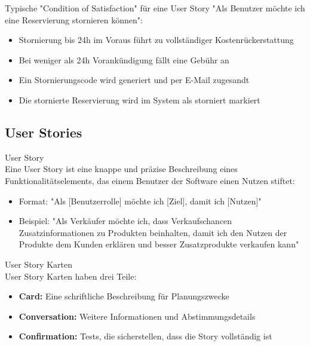\begin{example}
    Typische "Condition of Satisfaction" für eine User Story "Als Benutzer möchte ich eine Reservierung stornieren können":
    \begin{itemize}
        \item Stornierung bis 24h im Voraus führt zu vollständiger Kostenrückerstattung
        \item Bei weniger als 24h Vorankündigung fällt eine Gebühr an
        \item Ein Stornierungscode wird generiert und per E-Mail zugesandt
        \item Die stornierte Reservierung wird im System als storniert markiert
    \end{itemize}
\end{example}

\subsection{User Stories}

\begin{definition}{User Story}\\
    Eine User Story ist eine knappe und präzise Beschreibung eines Funktionalitätselements, das einem Benutzer der Software einen Nutzen stiftet:
    \begin{itemize}
        \item Format: "Als [Benutzerrolle] möchte ich [Ziel], damit ich [Nutzen]"
        \item Beispiel: "Als Verkäufer möchte ich, dass Verkaufschancen Zusatzinformationen zu Produkten beinhalten, damit ich den Nutzen der Produkte dem Kunden erklären und besser Zusatzprodukte verkaufen kann"
    \end{itemize}
\end{definition}

\begin{concept}{User Story Karten}\\
    User Story Karten haben drei Teile:
    \begin{itemize}
        \item \textbf{Card:} Eine schriftliche Beschreibung für Planungszwecke
        \item \textbf{Conversation:} Weitere Informationen und Abstimmungsdetails
        \item \textbf{Confirmation:} Tests, die sicherstellen, dass die Story vollständig ist
    \end{itemize}
\end{concept}

